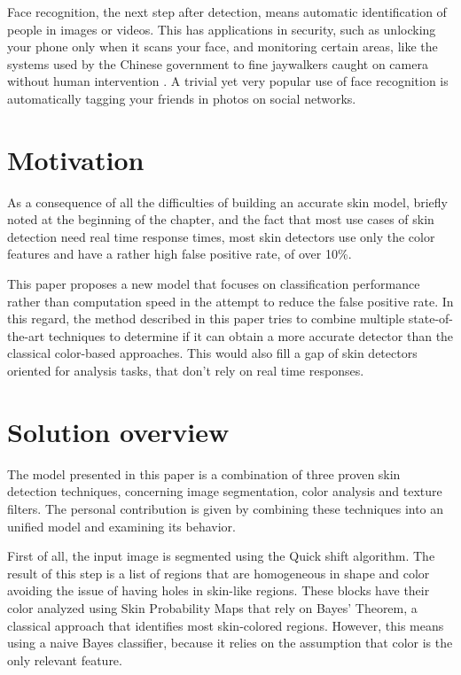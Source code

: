 \documentclass[12pt]{report}
\begin{document}
	Face recognition, the next step after detection, means automatic identification of people in images or videos\cite{detecting_faces_a_survey}. This has applications in security, such as unlocking your phone only when it scans your face, and monitoring certain areas, like the systems used by the Chinese government to fine jaywalkers caught on camera without human intervention \cite{jaywalkers_china}. A trivial yet very popular use of face recognition is automatically tagging your friends in photos on social networks.
	
	\section{Motivation}
	As a consequence of all the difficulties of building an accurate skin model, briefly noted at the beginning of the chapter, and the fact that most use cases of skin detection need real time response times, most skin detectors use only the color features and have a rather high false positive rate, of over 10\%\cite{survey_skin_color_modeling}. 
	
	This paper proposes a new model that focuses on classification performance rather than computation speed in the attempt to reduce the false positive rate. In this regard, the method described in this paper tries to combine multiple state-of-the-art techniques to determine if it can obtain a more accurate detector than the classical color-based approaches. This would also fill a gap of skin detectors oriented for analysis tasks, that don't rely on real time responses.
	
	\section{Solution overview}
	The model presented in this paper is a combination of three proven skin detection techniques, concerning image segmentation, color analysis and texture filters. The personal contribution is given by combining these techniques into an unified model and examining its behavior.
	
	First of all, the input image is segmented using the Quick shift algorithm. The result of this step is a list of regions that are homogeneous in shape and color avoiding the issue of having holes in skin-like regions. These blocks have their color analyzed using Skin Probability Maps that rely on Bayes' Theorem, a classical approach that identifies most skin-colored regions. However, this means using a naive Bayes classifier, because it relies on the assumption that color is the only relevant feature. 
	
\end{document}
